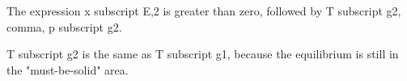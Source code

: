 The expression x subscript E,2 is greater than zero, followed by T subscript g2, comma, p subscript g2.

T subscript g2 is the same as T subscript g1, because the equilibrium is still in the "must-be-solid" area.